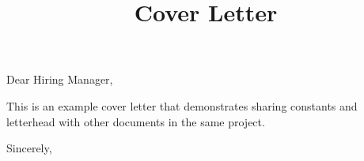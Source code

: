\documentclass[12pt]{article}
\title{Cover Letter}
\author{\MyName}
\date{\ProjectDate}
\begin{document}
\maketitle

Dear Hiring Manager,

This is an example cover letter that demonstrates sharing constants and letterhead with other documents in the same project.

Sincerely,

\MyName
\end{document}
